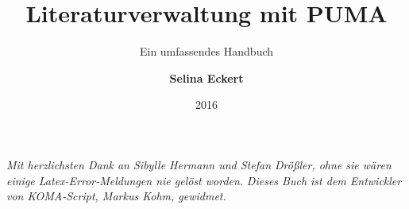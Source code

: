 \documentclass[b5paper,11pt,twoside]{scrbook} %
\begin{document}
 
    \title{\Huge Literaturverwaltung mit PUMA}
    \subtitle{\Large Ein umfassendes Handbuch}
    \author{\textbf{Selina Eckert}}
    \date{2016}

\maketitle
\newpage
\textit{Mit herzlichsten Dank an Sibylle Hermann und Stefan Drößler, ohne sie wären einige Latex-Error-Meldungen nie gelöst worden.}\newline\newline
\textit{Dieses Buch ist dem Entwickler von KOMA-Script, Markus Kohm, gewidmet.}%
\listoftodos
{} 
\clearpage
\tableofcontents 
\setcounter{secnumdepth}{3} 
\setcounter{tocdepth}{3} 
\newpage
{}
\pagestyle{headings}








 



\renewcommand{\indexname}{Stichwortverzeichnis}
\printindex
\end{document}
